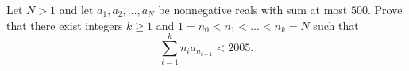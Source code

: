 Let $N>1$ and let $a_1,a_2,\dots,a_N$ be nonnegative reals with sum at most $500$. Prove that there exist integers $k\ge 1$ and $1=n_0<n_1<\dots<n_k=N$ such that
\[\sum_{i=1}^k n_ia_{n_{i-1}}<2005.\]